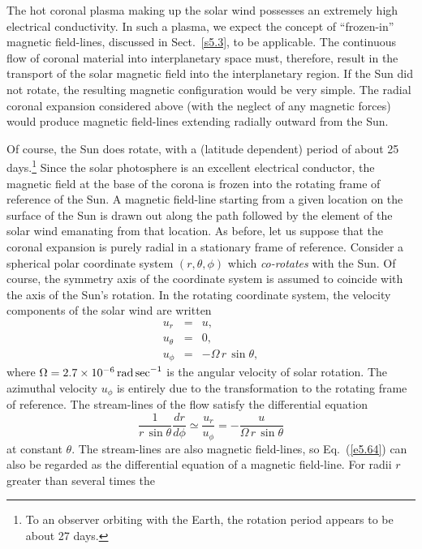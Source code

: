 The hot coronal plasma making up the
solar wind possesses an extremely high electrical conductivity. In such a
plasma, we expect the concept of ``frozen-in'' magnetic field-lines, discussed
in Sect.~\ref{s5.3}, to be applicable. The continuous flow of coronal material into
interplanetary space must, therefore, result in the transport of the solar
magnetic field into the interplanetary region. If the Sun did not rotate,
the resulting magnetic configuration would be very simple. The radial
coronal expansion considered above (with the neglect of any magnetic forces)
would produce magnetic field-lines extending radially outward from the Sun.

Of course, the Sun does rotate, with a (latitude dependent) period of
about 25 days.\footnote{To an observer orbiting with the Earth, the
rotation period appears to be about 27 days.} Since the solar photosphere is an
excellent electrical conductor, the magnetic field at the base of the
corona is frozen into the rotating frame of reference of the Sun.
A magnetic field-line starting from a given location on the surface of the Sun is
drawn out along the path followed by the element of the solar
wind emanating from that location. As before, let us suppose that the coronal expansion is
purely radial in a stationary frame of reference.
Consider a spherical
polar coordinate system $(r,\theta,\phi)$ which {\em co-rotates}\/ with the Sun.
Of course, the symmetry axis of the coordinate system is assumed to coincide
with the axis of the Sun's rotation. In the rotating coordinate system,
the velocity components of the solar wind are written
\begin{eqnarray}
u_r &=& u,\\[0.5ex]
u_\theta &=& 0,\\[0.5ex]
u_\phi &=& - {\Omega}\,r\,\sin\theta,
\end{eqnarray}
where ${\Omega}= 2.7\times 10^{-6}\,{\rm rad\,sec}^{-1}$ is the angular
velocity of solar rotation. The azimuthal velocity $u_\phi$ is entirely
due to the transformation to the rotating frame of reference. The stream-lines
of the flow satisfy the differential equation
\begin{equation}\label{e5.64}
\frac{1}{r\,\sin\theta}\frac{dr}{d\phi} \simeq \frac{u_r}{u_\phi} = -\frac{u}{
{\Omega}\,r\,\sin\theta}
\end{equation}
at constant $\theta$. The stream-lines are also magnetic field-lines,
so Eq.~(\ref{e5.64}) can also
be regarded as the differential equation of
a magnetic field-line. For radii $r$ greater than several times the
